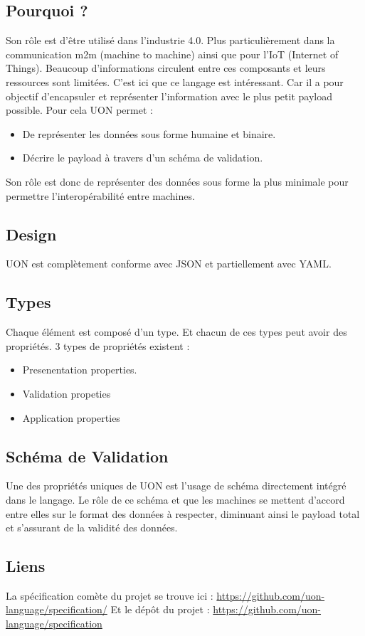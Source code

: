 \documentclass[
    iict, %
    il, %
]{heig-tb}
\begin{document}
\subsection{Pourquoi ?}
Son rôle est d'être utilisé dans l'industrie 4.0. Plus particulièrement dans la communication m2m (machine to machine) ainsi que pour l'IoT (Internet of Things).
Beaucoup d'informations circulent entre ces composants et leurs ressources sont limitées.
C'est ici que ce langage est intéressant. Car il a pour objectif d'encapsuler et représenter l'information avec le plus petit payload possible.
Pour cela UON permet :
\begin{itemize}
    \item De représenter les données sous forme humaine et binaire.
    \item Décrire le payload à travers d'un schéma de validation.
\end{itemize}
Son rôle est donc de représenter des données sous forme la plus minimale pour permettre l'interopérabilité entre machines.

\subsection{Design}
UON est complètement conforme avec JSON et partiellement avec YAML.

\subsection{Types}
Chaque élément est composé d'un type. Et chacun de ces types peut avoir des propriétés.
3 types de propriétés existent :
\begin{itemize}
    \item Presenentation properties.
    \item Validation propeties
    \item Application properties
\end{itemize}

\subsection{Schéma de Validation}
Une des propriétés uniques de UON est l'usage de schéma directement intégré dans le langage.
Le rôle de ce schéma et que les machines se mettent d'accord entre elles sur le format des données à respecter, diminuant ainsi le payload total et s'assurant de la validité des données.

\subsection{Liens}
La spécification comète du projet se trouve ici : \href{https://github.com/uon-language/specification/}{https://github.com/uon-language/specification/}
Et le dépôt du projet : \href{https://github.com/uon-language/specification}{https://github.com/uon-language/specification}
\end{document}
